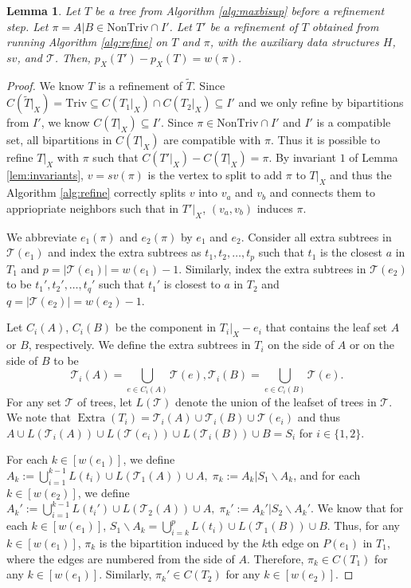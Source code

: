 \documentclass{bmcart}
\newcommand{\triv}{\mathrm{Triv}}
\newcommand{\ntriv}{\mathrm{NonTriv}}
\DeclareMathOperator*{\extra}{Extra}
\newtheorem{lemma}{Lemma}
\begin{document}
\begin{lemma}\label{lem:refine_achieves_weight}
Let $T$ be a tree from Algorithm \ref{alg:maxbisup} before a refinement step. Let $\pi = A|B \in \ntriv \cap I'$. Let $T'$ be a refinement of $T$ obtained from running Algorithm \ref{alg:refine} on $T$ and $\pi$, with the auxiliary data structures $H$, $sv$, and $\mathcal{T}$. Then, $p_X(T') - p_X(T) = w(\pi)$. 
\end{lemma}
\begin{proof}
    We know $T$ is a refinement of $\tilde{T}$. Since $C(\tilde{T}|_X) = \triv \subseteq C(T_1|_X) \cap C(T_2|_X) \subseteq I'$ and we only refine by bipartitions from $I'$, we know $C(T|_X) \subseteq I'$. Since $\pi \in \ntriv \cap I'$ and $I'$ is a compatible set, all bipartitions in $C(T|_X)$ are compatible with $\pi$. Thus it is possible to refine $T|_X$ with $\pi$ such that $C(T'|_X) - C(T|_X) = \pi$. By invariant $1$ of Lemma \ref{lem:invariants}, $v = sv(\pi)$ is the vertex to split to add $\pi$ to $T|_X$ and thus the Algorithm \ref{alg:refine} correctly splits $v$ into $v_a$ and $v_b$ and connects them to appriopriate neighbors such that in $T'|_X$, $(v_a,v_b)$ induces $\pi$.\smallskip

    We abbreviate $e_1(\pi)$ and $e_2(\pi)$ by $e_1$ and $e_2$.  Consider all extra subtrees in $\mathcal{T}(e_1)$ and index the extra subtrees as $t_1, t_2, \dots, t_p$ such that $t_1$ is the closest $a$ in $T_1$ and $p = |\mathcal{T}(e_1)| = w(e_1)-1$. Similarly, index the extra subtrees in $\mathcal{T}(e_2)$ to be $t_1', t_2', \dots, t_q'$ such that $t_1'$ is closest to $a$ in $T_2$ and $q = |\mathcal{T}(e_2)| = w(e_2)-1$. \smallskip

    Let $C_i(A)$, $C_i(B)$ be the component in $T_i|_X - e_i$ that contains the leaf set $A$ or $B$, respectively. We define the extra subtrees in $T_i$ on the side of $A$ or on the side of $B$ to be \[\mathcal{T}_i(A) = \bigcup_{e \in C_i(A)} \mathcal{T}(e), \mathcal{T}_i(B) = \bigcup_{e \in C_i(B)} \mathcal{T}(e). \]
    For any set $\mathcal{T}$ of trees, let $L(\mathcal{T})$ denote the union of the leafset of trees in $\mathcal{T}$. We note that $\extra(T_i) = \mathcal{T}_i(A) \cup \mathcal{T}_i(B) \cup \mathcal{T}(e_i)$ and thus $A \cup L(\mathcal{T}_i(A)) \cup L(\mathcal{T}(e_i)) \cup L(\mathcal{T}_i(B)) \cup B = S_i$ for $i \in \{1,2\}$. \smallskip

    For each $k \in [w(e_1)]$, we define
    $A_k := \bigcup_{i = 1}^{k-1} L(t_i) \cup L(\mathcal{T}_1(A)) \cup A,\; \pi_k := A_k | S_1 \backslash A_k$, and for each $k \in [w(e_2)]$, we define
    $A_k' := \bigcup_{i = 1}^{k-1} L(t_i') \cup L(\mathcal{T}_2(A)) \cup A,\; \pi_k' := A_k' | S_2 \backslash A_k'$.
    We know that for each $k \in [w(e_1)]$, $S_1 \backslash A_k = \bigcup_{i = k}^{p} L(t_i) \cup L(\mathcal{T}_1(B)) \cup B$. Thus, for any $k \in [w(e_1)]$, $\pi_k$ is the bipartition induced by the $k$th edge on $P(e_1)$ in $T_1$, where the edges are numbered from the side of $A$. Therefore, $\pi_k \in C(T_1)$ for any $k \in [w(e_1)]$. Similarly, $\pi_k' \in C(T_2)$  for any $k \in [w(e_2)]$. \smallskip


\end{proof}
\end{document}
